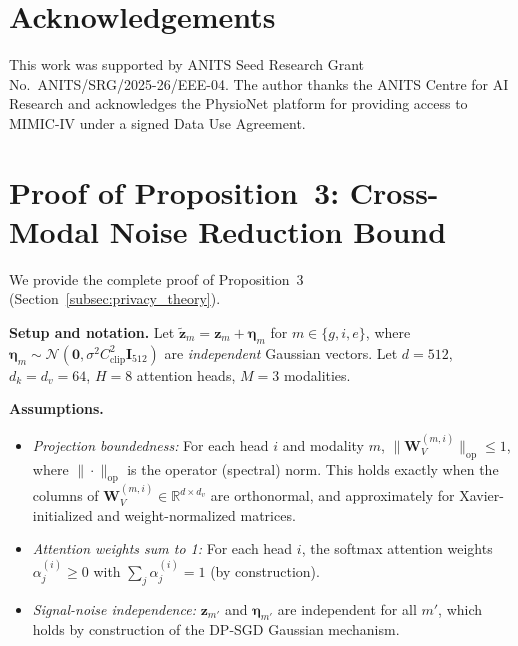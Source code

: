 \documentclass[a4paper,fleqn]{cas-dc}
\begin{document}
\section*{Acknowledgements}
This work was supported by ANITS Seed Research Grant
No.~ANITS/SRG/2025-26/EEE-04. The author thanks the ANITS Centre for AI
Research and acknowledges the PhysioNet platform for providing access to
MIMIC-IV under a signed Data Use Agreement.




\appendix
\small
\hfuzz=10pt
\section{Proof of Proposition~3: Cross-Modal Noise Reduction Bound}
\label{app:proof}

We provide the complete proof of Proposition~3 (Section~\ref{subsec:privacy_theory}).

\textbf{Setup and notation.}
Let $\tilde{\mathbf{z}}_m = \mathbf{z}_m + \boldsymbol{\eta}_m$ for
$m \in \{g, i, e\}$, where $\boldsymbol{\eta}_m \!\sim\!
\mathcal{N}(\mathbf{0}, \sigma^2 C_{\mathrm{clip}}^2 \mathbf{I}_{512})$
are \emph{independent} Gaussian vectors. Let $d = 512$, $d_k = d_v = 64$,
$H = 8$ attention heads, $M = 3$ modalities.

\textbf{Assumptions.}
\begin{itemize}
\item[(A1)] \textit{Projection boundedness:} For each head $i$ and modality $m$,
  $\|\mathbf{W}_V^{(m,i)}\|_{\mathrm{op}} \leq 1$, where $\|\cdot\|_{\mathrm{op}}$
  is the operator (spectral) norm. This holds exactly when the columns of
  $\mathbf{W}_V^{(m,i)} \in \mathbb{R}^{d \times d_v}$ are orthonormal, and
  approximately for Xavier-initialized and weight-normalized matrices.
\item[(A2)] \textit{Attention weights sum to 1:}
  For each head $i$, the softmax attention weights
  $\alpha_j^{(i)} \geq 0$ with $\sum_j \alpha_j^{(i)} = 1$ (by construction).
\item[(A3)] \textit{Signal-noise independence:}
  $\mathbf{z}_{m'}$ and $\boldsymbol{\eta}_{m'}$ are independent for all $m'$,
  which holds by construction of the DP-SGD Gaussian mechanism.
\end{itemize}
\end{document}
